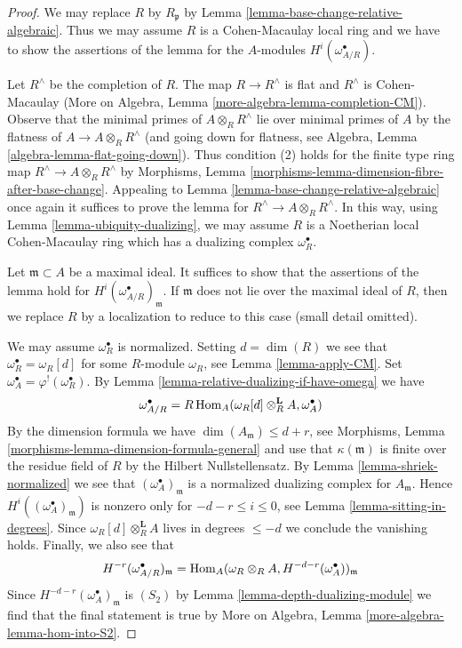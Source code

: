 \begin{proof}
We may replace $R$ by $R_\mathfrak p$ by
Lemma \ref{lemma-base-change-relative-algebraic}.
Thus we may assume $R$ is a Cohen-Macaulay local ring
and we have to show the assertions of the lemma
for the $A$-modules $H^i(\omega_{A/R}^\bullet)$.

\medskip\noindent
Let $R^\wedge$ be the completion of $R$.
The map $R \to R^\wedge$ is flat and $R^\wedge$ is Cohen-Macaulay
(More on Algebra, Lemma \ref{more-algebra-lemma-completion-CM}).
Observe that the minimal primes of $A \otimes_R R^\wedge$
lie over minimal primes of $A$ by the flatness of
$A \to A \otimes_R R^\wedge$ (and going down for flatness, see
Algebra, Lemma \ref{algebra-lemma-flat-going-down}).
Thus condition (2) holds for the finite type ring map
$R^\wedge \to A \otimes_R R^\wedge$ by
Morphisms, Lemma \ref{morphisms-lemma-dimension-fibre-after-base-change}.
Appealing to Lemma \ref{lemma-base-change-relative-algebraic}
once again it suffices to prove the lemma for
$R^\wedge \to A \otimes_R R^\wedge$. In this way, using
Lemma \ref{lemma-ubiquity-dualizing},
we may assume $R$ is a Noetherian local
Cohen-Macaulay ring which has a dualizing complex $\omega_R^\bullet$.

\medskip\noindent
Let $\mathfrak m \subset A$ be a maximal ideal.
It suffices to show that the assertions of
the lemma hold for $H^i(\omega_{A/R}^\bullet)_\mathfrak m$.
If $\mathfrak m$ does not lie over the maximal ideal of $R$,
then we replace $R$ by a localization to reduce to this case
(small detail omitted). 

\medskip\noindent
We may assume $\omega_R^\bullet$ is normalized.
Setting $d = \dim(R)$ we see that $\omega_R^\bullet = \omega_R[d]$
for some $R$-module $\omega_R$, see
Lemma \ref{lemma-apply-CM}. Set
$\omega_A^\bullet = \varphi^!(\omega_R^\bullet)$.
By Lemma \ref{lemma-relative-dualizing-if-have-omega} we have
$$
\omega_{A/R}^\bullet =
R\mathop{\mathrm{Hom}}\nolimits_A(\omega_R[d] \otimes_R^\mathbf{L} A, \omega_A^\bullet)
$$
By the dimension formula we have $\dim(A_\mathfrak m) \leq d + r$, see
Morphisms, Lemma \ref{morphisms-lemma-dimension-formula-general}
and use that $\kappa(\mathfrak m)$ is finite over the residue field of $R$
by the Hilbert Nullstellensatz.
By Lemma \ref{lemma-shriek-normalized}
we see that $(\omega_A^\bullet)_\mathfrak m$
is a normalized dualizing complex for $A_\mathfrak m$.
Hence $H^i((\omega_A^\bullet)_\mathfrak m)$ is nonzero
only for $-d - r \leq i \leq 0$, see
Lemma \ref{lemma-sitting-in-degrees}.
Since $\omega_R[d] \otimes_R^\mathbf{L} A$ lives in
degrees $\leq -d$ we conclude the vanishing holds.
Finally, we also see that
$$
H^{-r}(\omega_{A/R}^\bullet)_\mathfrak m =
\mathop{\mathrm{Hom}}\nolimits_A(\omega_R \otimes_R A, H^{-d - r}(\omega_A^\bullet))_\mathfrak m
$$
Since $H^{-d - r}(\omega_A^\bullet)_\mathfrak m$ is $(S_2)$ by
Lemma \ref{lemma-depth-dualizing-module}
we find that the final statement is true by
More on Algebra, Lemma \ref{more-algebra-lemma-hom-into-S2}.
\end{proof}



